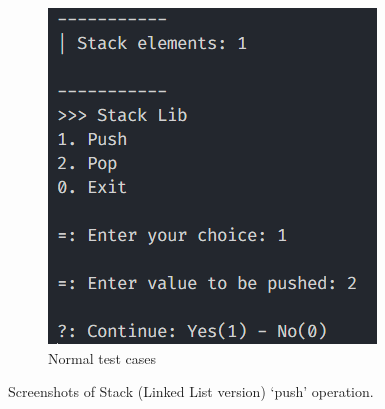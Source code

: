 \begin{figure}[!ht]
\begin{subfigure}{0.43\textwidth}
		\includegraphics[width=\textwidth]{imgs/StackLinkedList/push/normal.png}
		\caption{Normal test cases}\label{fig:stack_ll_push_normal}
	\end{subfigure}
	\caption{Screenshots of Stack (Linked List version) `push' operation.}\label{fig:stack_ll_push_cases}
\end{figure}
